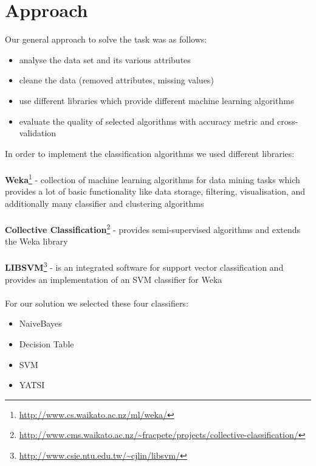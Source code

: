 \section{Approach}
\label{approach}


Our general approach to solve the task was as follows:
\\
\begin{itemize}
	\item[\textbullet] analyse the data set and its various attributes
	\item[\textbullet] cleane the data (removed attributes, missing values)
	\item[\textbullet] use different libraries which provide different machine learning algorithms
	\item[\textbullet] evaluate the quality of selected algorithms with accuracy metric and cross-validation
\end{itemize}
In order to implement the classification algorithms we used different libraries: \\
\\
\textbf{Weka}\footnote{\url{http://www.cs.waikato.ac.nz/ml/weka/}} -
collection of machine learning algorithms for data mining tasks which provides a lot of basic functionality like data storage, filtering, visualisation, and additionally many classifier and clustering algorithms \\
\\
\textbf{Collective Classification}\footnote{\url{http://www.cms.waikato.ac.nz/~fracpete/projects/collective-classification/}} - 
provides semi-supervised algorithms and extends the Weka library \\
\\
\textbf{LIBSVM}\footnote{\url{http://www.csie.ntu.edu.tw/~cjlin/libsvm/}} - 
is an integrated software for support vector classification and provides an implementation of an SVM classifier for Weka \\
\\
For our solution we selected these four classifiers:
\begin{itemize}
	\item[\textbullet] NaiveBayes
	\item[\textbullet] Decision Table
	\item[\textbullet] SVM
	\item[\textbullet] YATSI
\end{itemize}
